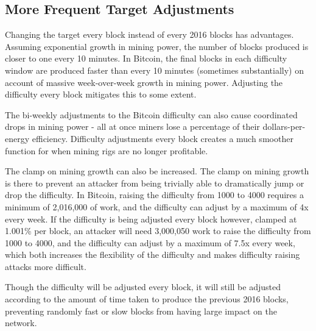 \documentclass[twocolumn]{article}
\begin{document}

\subsection{More Frequent Target Adjustments}
Changing the target every block instead of every 2016 blocks has advantages.
Assuming exponential growth in mining power, the number of blocks produced is closer to one every 10 minutes.
In Bitcoin, the final blocks in each difficulty window are produced faster than every 10 minutes (sometimes substantially) on account of massive week-over-week growth in mining power.
Adjusting the difficulty every block mitigates this to some extent.

The bi-weekly adjustments to the Bitcoin difficulty can also cause coordinated drops in mining power - all at once miners lose a percentage of their dollars-per-energy efficiency.
Difficulty adjustments every block creates a much smoother function for when mining rigs are no longer profitable.

The clamp on mining growth can also be increased.
The clamp on mining growth is there to prevent an attacker from being trivially able to dramatically jump or drop the difficulty.
In Bitcoin, raising the difficulty from 1000 to 4000 requires a minimum of 2,016,000 of work, and the difficulty can adjust by a maximum of 4x every week.
If the difficulty is being adjusted every block however, clamped at 1.001\% per block, an attacker will need 3,000,050 work to raise the difficulty from 1000 to 4000, and the difficulty can adjust by a maximum of 7.5x every week, which both increases the flexibility of the difficulty and makes difficulty raising attacks more difficult.

Though the difficulty will be adjusted every block, it will still be adjusted according to the amount of time taken to produce the previous 2016 blocks, preventing randomly fast or slow blocks from having large impact on the network.
\end{document}
